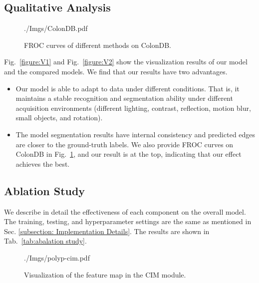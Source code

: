 \documentclass[journal]{IEEEtran}
\newcommand{\secref}[1]{Sec. \ref{#1}}
\begin{document}
\subsection{Qualitative Analysis}

\begin{figure}[t!]
 	\centering
 	\begin{overpic}[width=.99\linewidth]{./Imgs/ColonDB.pdf}
    \end{overpic}
    \vspace{-10pt}
 	\caption{FROC curves of different methods on ColonDB.}
     \label{figure:froc}
\end{figure}

Fig.~\ref{figure:V1} and Fig.~\ref{figure:V2} show the visualization results of our model and the compared models. We find that our results have two advantages. 
\begin{itemize}
    \vspace{-5pt}
    \item Our model is able to adapt to data under different conditions. That is, it maintains a stable recognition and segmentation ability under different acquisition environments (different lighting, contrast, reflection, motion blur, small objects, and rotation).
    \vspace{-5pt}
    \item The model segmentation results have internal consistency and predicted edges are closer to the ground-truth labels. We also provide FROC curves on ColonDB in Fig.~\ref{figure:froc}, and our result is at the top, indicating that our effect achieves the best. 
    \vspace{-5pt}
\end{itemize}




\subsection{Ablation Study}
We describe in detail the effectiveness of each component on the overall model. 
The training, testing, and hyperparameter settings are the same as mentioned in \secref{subsection: Implementation Details}.
The results are shown in Tab.~\ref{tab:abalation study}.

\begin{figure}[t!]
 	\centering
 	\begin{overpic}[width=\linewidth]{./Imgs/polyp-cim.pdf}
    \end{overpic}
    \vspace{-10pt}
 	\caption{Visualization of the feature map in the CIM module.}
     \label{figure:cimv}
\end{figure}
\end{document}
